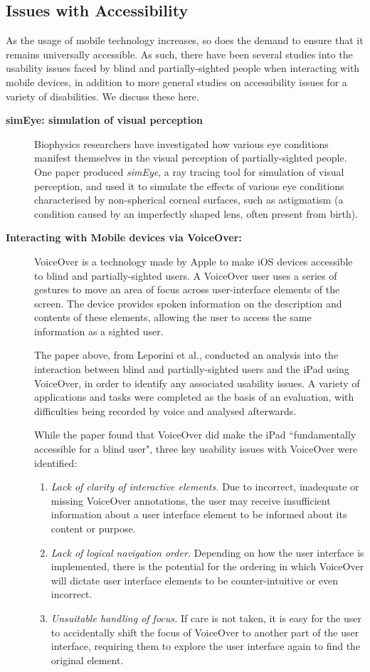 \documentclass[10pt,twocolumn]{article}
\newcommand{\citep}[1]{}
\begin{document}
\subsection{Issues with Accessibility}
As the usage of mobile technology increases, so does the demand to ensure that it remains universally accessible. As such, there have been several studies into the usability issues faced by blind and partially-sighted people when interacting with mobile devices, in addition to more general studies on accessibility issues for a variety of disabilities. We discuss these here.
\begin{description}
\item[\textbf{simEye: simulation of visual perception}]
Biophysics researchers have investigated how various eye conditions manifest themselves in the visual perception of partially-sighted people. One paper produced \textit{simEye},  a ray tracing tool for simulation of visual perception, and used it to simulate the effects of various eye conditions characterised by non-spherical corneal surfaces\citep{simEye}, such as astigmatism (a condition caused by an imperfectly shaped lens, often present from birth\citep{astigmatism}). 

\item[\textbf{Interacting with Mobile devices via VoiceOver:}]
VoiceOver is a technology made by Apple to make iOS devices accessible to blind and partially-sighted users. A VoiceOver user uses a series of gestures to move an area of focus across user-interface elements of the screen. The device provides spoken information on the description and contents of these elements, allowing the user to access the same information as a sighted user.

The paper above, from Leporini et al., conducted an analysis into the interaction between blind and partially-sighted users and the iPad using VoiceOver, in order to identify any associated usability issues. A variety of applications and tasks were completed as the basis of an evaluation, with difficulties being recorded by voice and analysed afterwards.

While the paper found that VoiceOver did make the iPad ``fundamentally accessible for a blind user"\citep{voiceover}, three key usability issues with VoiceOver were identified:
\begin{enumerate}
\item \textit{Lack of clarity of interactive elements.}  Due to incorrect, inadequate or missing VoiceOver annotations, the user may receive insufficient information about a user interface element to be informed about its content or purpose.
\item \textit{Lack of logical navigation order.}  Depending on how the user interface is implemented, there is the potential for the ordering in which VoiceOver will dictate user interface elements to be counter-intuitive or even incorrect.
\item \textit{Unsuitable handling of focus.}  If care is not taken, it is easy for the user to accidentally shift the focus of VoiceOver to another part of the user interface, requiring them to explore the user interface again to find the original element.
\end{enumerate}


\end{description}
\end{document}
